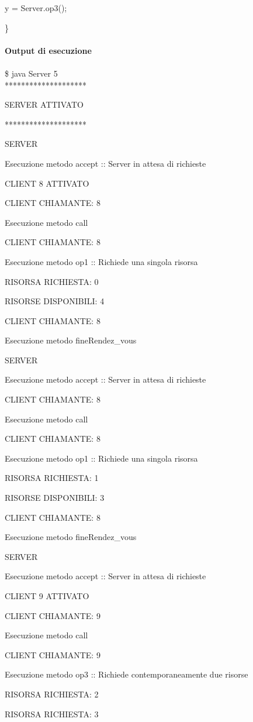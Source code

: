\documentclass[10pt, a4paper]{article}
\begin{document}
		y = Server.op3();

\}
\\\\
\textbf{Output di esecuzione}
\\\\
\$ java Server 5
\\

********************

SERVER ATTIVATO

********************

SERVER

Esecuzione metodo accept :: Server in attesa di richieste

CLIENT 8 ATTIVATO

CLIENT CHIAMANTE: 8

Esecuzione metodo call

CLIENT CHIAMANTE: 8

Esecuzione metodo op1 :: Richiede una singola risorsa

RISORSA RICHIESTA: 0

RISORSE DISPONIBILI: 4

CLIENT CHIAMANTE: 8

Esecuzione metodo fineRendez\_vous

SERVER

Esecuzione metodo accept :: Server in attesa di richieste

CLIENT CHIAMANTE: 8

Esecuzione metodo call

CLIENT CHIAMANTE: 8

Esecuzione metodo op1 :: Richiede una singola risorsa

RISORSA RICHIESTA: 1

RISORSE DISPONIBILI: 3

CLIENT CHIAMANTE: 8

Esecuzione metodo fineRendez\_vous

SERVER

Esecuzione metodo accept :: Server in attesa di richieste

CLIENT 9 ATTIVATO

CLIENT CHIAMANTE: 9

Esecuzione metodo call

CLIENT CHIAMANTE: 9

Esecuzione metodo op3 :: Richiede contemporaneamente due risorse

RISORSA RICHIESTA: 2

RISORSA RICHIESTA: 3
\end{document}
